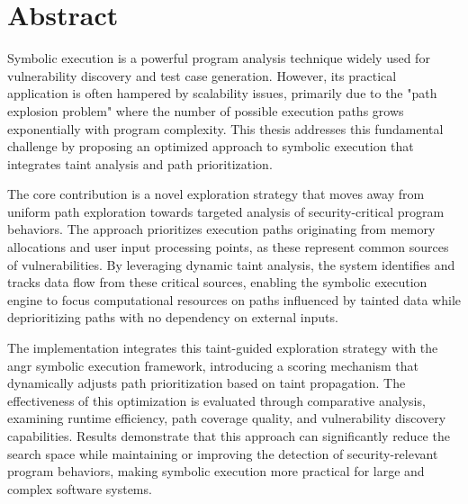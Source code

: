 \chapter{Abstract}

Symbolic execution is a powerful program analysis technique widely used for vulnerability discovery and test case generation. However, its practical application is often hampered by scalability issues, primarily due to the "path explosion problem" where the number of possible execution paths grows exponentially with program complexity. This thesis addresses this fundamental challenge by proposing an optimized approach to symbolic execution that integrates taint analysis and path prioritization.

The core contribution is a novel exploration strategy that moves away from uniform path exploration towards targeted analysis of security-critical program behaviors. The approach prioritizes execution paths originating from memory allocations and user input processing points, as these represent common sources of vulnerabilities. By leveraging dynamic taint analysis, the system identifies and tracks data flow from these critical sources, enabling the symbolic execution engine to focus computational resources on paths influenced by tainted data while deprioritizing paths with no dependency on external inputs.

The implementation integrates this taint-guided exploration strategy with the angr symbolic execution framework, introducing a scoring mechanism that dynamically adjusts path prioritization based on taint propagation. The effectiveness of this optimization is evaluated through comparative analysis, examining runtime efficiency, path coverage quality, and vulnerability discovery capabilities. Results demonstrate that this approach can significantly reduce the search space while maintaining or improving the detection of security-relevant program behaviors, making symbolic execution more practical for large and complex software systems.
